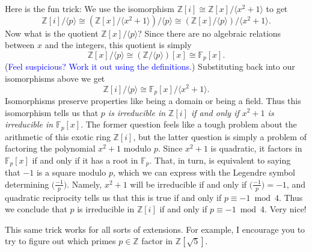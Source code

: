 \documentclass[11pt]{article}
\def\ZZ{\mathbb{Z}}
\def\FF{\mathbb{F}}
\newcommand{\tlegendre}[2]{\ensuremath{\big( \frac{#1}{#2} \big) }}
\theoremstyle{definition}
\numberwithin{equation}{subsection}
\newcommand{\blue}[1]{\textcolor{blue}{#1}}
\begin{document}
Here is the fun trick: We use the isomorphism $\ZZ[i] \cong \ZZ[x]/\langle x^2 + 1\rangle$ to get
\[
    \ZZ[i]/\langle p \rangle \cong (\ZZ[x]/\langle x^2 + 1\rangle)/\langle p \rangle
    \cong (\ZZ[x]/\langle p\rangle)/\langle x^2 + 1\rangle.
\]
Now what is the quotient $\ZZ[x]/\langle p\rangle$?
Since there are no algebraic relations between $x$ and the integers, this quotient is simply
\[
    \ZZ[x]/\langle p\rangle \cong (\ZZ/\langle p\rangle)[x] \cong \FF_p[x].
\]
(\blue{Feel suspicious? Work it out using the definitions.})
Substituting back into our isomorphisms above we get
\[
    \ZZ[i]/\langle p \rangle \cong \FF_p[x]/\langle x^2 + 1\rangle.
\]
Isomorphisms preserve properties like being a domain or being a field.
Thus this isomorphism tells us that \emph{$p$ is irreducible in $\ZZ[i]$ if and only if $x^2 + 1$ is irreducible in $\FF_p[x]$}.
The former question feels like a tough problem about the arithmetic of this exotic ring $\ZZ[i]$, but the latter question is simply a problem of factoring the polynomial $x^2 + 1$ modulo $p$.
Since $x^2 + 1$ is quadratic, it factors in $\FF_p[x]$ if and only if it has a root in $\FF_p$.
That, in turn, is equivalent to saying that $-1$ is a square modulo $p$, which we can express with the Legendre symbol determining $\tlegendre{-1}{p}$.
Namely, $x^2 + 1$ will be irreducible if and only if $\tlegendre{-1}{p} = -1$, and quadratic reciprocity tells us that this is true if and only if $p \equiv -1 \bmod 4$.
Thus we conclude that $p$ is irreducible in $\ZZ[i]$ if and only if $p \equiv -1 \bmod 4$.
Very nice!

This same trick works for all sorts of extensions.
For example, I encourage you to try to figure out which primes $p \in \ZZ$ factor in $\ZZ[\sqrt{5}]$.
\end{document}
